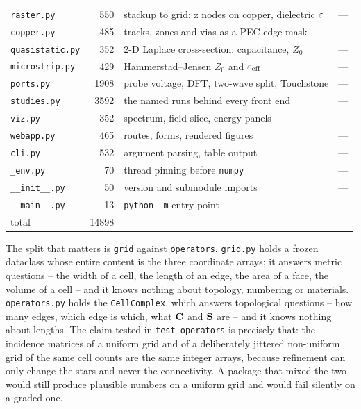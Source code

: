 \begin{table}[H]
\begin{tabular}{@{}l r p{7.0cm} p{3.6cm}@{}}
    \texttt{raster.py}     & 550  & stackup to grid: z nodes on copper, dielectric $\varepsilon$ & --- \\
    \texttt{copper.py}     & 485  & tracks, zones and vias as a PEC edge mask & --- \\
    \texttt{quasistatic.py} & 352 & 2-D Laplace cross-section: capacitance, $Z_0$ & --- \\
    \texttt{microstrip.py} & 429  & Hammerstad--Jensen $Z_0$ and $\varepsilon_\mathrm{eff}$ & --- \\
    \texttt{ports.py}      & 1908 & probe voltage, DFT, two-wave split, Touchstone & --- \\
    \texttt{studies.py}    & 3592 & the named runs behind every front end & --- \\
    \texttt{viz.py}        & 352  & spectrum, field slice, energy panels & --- \\
    \texttt{webapp.py}     & 465  & routes, forms, rendered figures & --- \\
    \texttt{cli.py}        & 532  & argument parsing, table output & --- \\
    \texttt{\_env.py}      & 70   & thread pinning before \texttt{numpy} & --- \\
    \texttt{\_\_init\_\_.py} & 50 & version and submodule imports & --- \\
    \texttt{\_\_main\_\_.py} & 13 & \texttt{python -m} entry point & --- \\
    \midrule
    total                  & 14898 &                                                      & \\
    \bottomrule
  \end{tabular}
\end{table}

The split that matters is \texttt{grid} against \texttt{operators}. \texttt{grid.py} holds a frozen dataclass
whose entire content is the three coordinate arrays; it answers metric questions -- the width of a cell, the
length of an edge, the area of a face, the volume of a cell -- and it knows nothing about topology, numbering or
materials. \texttt{operators.py} holds the \texttt{CellComplex}, which answers topological questions -- how many
edges, which edge is which, what $\mathbf{C}$ and $\mathbf{S}$ are -- and it knows nothing about lengths. The claim tested
in \texttt{test\_operators} is precisely that: the incidence matrices of a uniform grid and of a deliberately
jittered non-uniform grid of the same cell counts are the same integer arrays, because refinement can only change
the stars and never the connectivity. A package that mixed the two would still produce plausible numbers on a
uniform grid and would fail silently on a graded one.

